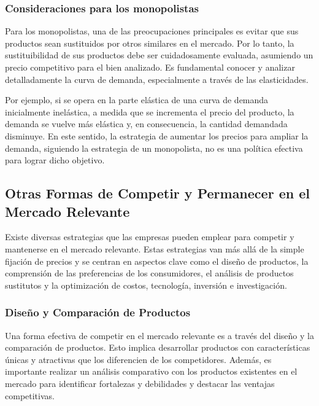 \documentclass[
  a4paper,
]{article}
\begin{document}
\hypertarget{consideraciones-para-los-monopolistas}{%
\subsubsection{Consideraciones para los
monopolistas}\label{consideraciones-para-los-monopolistas}}

Para los monopolistas, una de las preocupaciones principales es evitar
que sus productos sean sustituidos por otros similares en el mercado.
Por lo tanto, la sustituibilidad de sus productos debe ser
cuidadosamente evaluada, asumiendo un precio competitivo para el bien
analizado. Es fundamental conocer y analizar detalladamente la curva de
demanda, especialmente a través de las elasticidades.

Por ejemplo, si se opera en la parte elástica de una curva de demanda
inicialmente inelástica, a medida que se incrementa el precio del
producto, la demanda se vuelve más elástica y, en consecuencia, la
cantidad demandada disminuye. En este sentido, la estrategia de aumentar
los precios para ampliar la demanda, siguiendo la estrategia de un
monopolista, no es una política efectiva para lograr dicho objetivo.

\hypertarget{otras-formas-de-competir-y-permanecer-en-el-mercado-relevante}{%
\subsection{Otras Formas de Competir y Permanecer en el Mercado
Relevante}\label{otras-formas-de-competir-y-permanecer-en-el-mercado-relevante}}

Existe diversas estrategias que las empresas pueden emplear para
competir y mantenerse en el mercado relevante. Estas estrategias van más
allá de la simple fijación de precios y se centran en aspectos clave
como el diseño de productos, la comprensión de las preferencias de los
consumidores, el análisis de productos sustitutos y la optimización de
costos, tecnología, inversión e investigación.

\hypertarget{diseuxf1o-y-comparaciuxf3n-de-productos}{%
\subsubsection{Diseño y Comparación de
Productos}\label{diseuxf1o-y-comparaciuxf3n-de-productos}}

Una forma efectiva de competir en el mercado relevante es a través del
diseño y la comparación de productos. Esto implica desarrollar productos
con características únicas y atractivas que los diferencien de los
competidores. Además, es importante realizar un análisis comparativo con
los productos existentes en el mercado para identificar fortalezas y
debilidades y destacar las ventajas competitivas.
\end{document}
